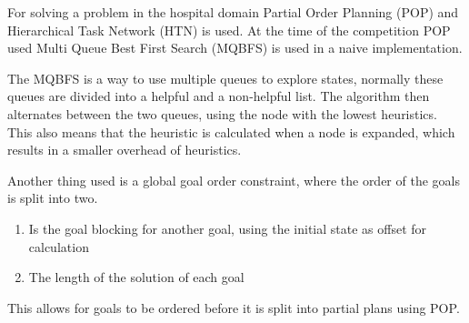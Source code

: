 \documentclass[Main]{subfiles}
\begin{document}
For solving a problem in the hospital domain Partial Order Planning (POP) and Hierarchical Task Network (HTN) is used. At the time of the competition POP used Multi Queue Best First Search \cite{hector2013a} (MQBFS) is used in a naive implementation. \par
The MQBFS is a way to use multiple queues to explore states, normally these queues are divided into a helpful and a non-helpful list. The algorithm then alternates between the two queues, using the node with the lowest heuristics. This also means that the heuristic is calculated when a node is expanded, which results in a smaller overhead of heuristics. \par
Another thing used is a global goal order constraint, where the order of the goals is split into two.
\begin{enumerate}
	\item Is the goal blocking for another goal, using the initial state as offset for calculation
	\item The length of the solution of each goal
\end{enumerate}
This allows for goals to be ordered before it is split into partial plans using POP. 
\end{document}
